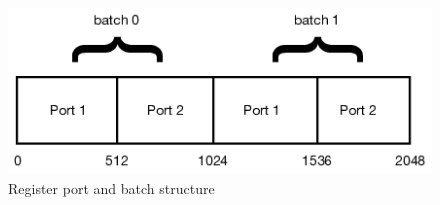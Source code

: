 \documentclass[11pt,oneside,a4paper]{article}
\begin{document}
\begin{figure}
	\centering
	\includegraphics[width=0.7\linewidth]{figures/ex06-register-structure}
	\caption{Register port and batch structure}
	\label{fig:ex06-register-structure}
\end{figure}






\label{lastpage} %
\clearpage
{}



\clearpage
\appendix
{}
\end{document}
